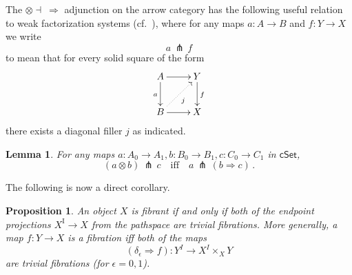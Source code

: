 \documentclass[11pt,reqno]{amsart}
\newcommand{\cSet}{\ensuremath{\mathsf{cSet}}}
\newcommand{\ra}{\ensuremath{\rightarrow}}
\renewcommand{\to}{\ensuremath{\rightarrow}}
\newcommand{\I}{\ensuremath{\mathrm{I}}}
\newtheorem{proposition}[theorem]{Proposition}
\newtheorem{lemma}[theorem]{Lemma}
\theoremstyle{remark}
\theoremstyle{definition}
\begin{document}
The $\otimes\dashv\ \Rightarrow$ adjunction on the arrow category has the following useful relation to weak factorization systems (cf.~\cite{GS,Riehl,JT:notes}), where for any maps $a : A \ra B$ and $f : Y\ra X$ we write 
\[
a\, \pitchfork\, f 
\]
to mean that for every solid square of the form
\begin{equation}\label{eq:defpitchfork}
\xymatrix{
A\ar[d]_{a} \ar[r] & Y \ar[d]^f \\
B \ar@{.>}[ru]_j \ar[r] & X
}
\end{equation}
there exists a diagonal filler $j$ as indicated. 

\begin{lemma}\label{lemma:Leibniz}
For any maps $a : A_0 \to A_1, b : B_0 \to B_1, c : C_0 \to C_1$ in $\cSet$,
\[
(a\otimes b)\, \pitchfork\, c\quad\text{iff}\quad a\, \pitchfork\, (b\Rightarrow\! c)\,.
\]
\end{lemma}

The following is now a direct corollary.

\begin{proposition}\label{prop:algequivfill}
An object $X$ is fibrant if and only if both of the endpoint  projections $X^\I \ra X$ from the pathspace are trivial fibrations. More generally, a map $f : Y\ra X$ is a fibration iff both of the maps 
\[
(\delta_\epsilon \Rightarrow f) : Y^I \ra X^I\times_X Y
\]
 are trivial fibrations (for $\epsilon = 0,1$).
\end{proposition}
\end{document}

